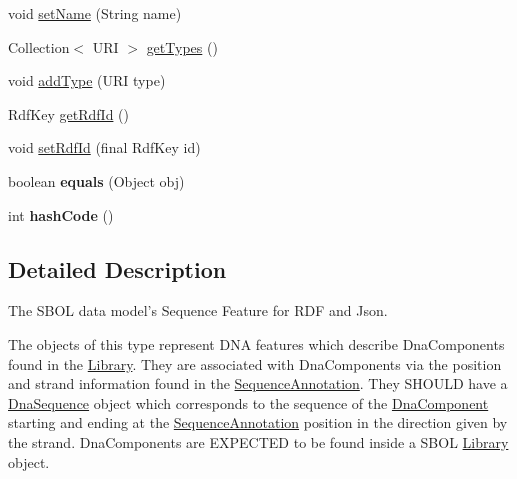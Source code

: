\begin{DoxyCompactItemize}
\item 
void \hyperlink{classorg_1_1sbolstandard_1_1lib_s_b_o_lj_1_1_sequence_feature_af407b7f97daa1f39f040acf4ac6c830c}{setName} (String name)
\item 
Collection$<$ URI $>$ \hyperlink{classorg_1_1sbolstandard_1_1lib_s_b_o_lj_1_1_sequence_feature_a75554518929bf85671383ac2c0839963}{getTypes} ()
\item 
void \hyperlink{classorg_1_1sbolstandard_1_1lib_s_b_o_lj_1_1_sequence_feature_ae714b030621449e61274bdb84a09c0fb}{addType} (URI type)
\item 
RdfKey \hyperlink{classorg_1_1sbolstandard_1_1lib_s_b_o_lj_1_1_sequence_feature_a6fd7acfe199c9c10f6f415a95254e64c}{getRdfId} ()
\item 
void \hyperlink{classorg_1_1sbolstandard_1_1lib_s_b_o_lj_1_1_sequence_feature_a1f7950ca9962cf04e766100c0c55e1ea}{setRdfId} (final RdfKey id)
\item 
\hypertarget{classorg_1_1sbolstandard_1_1lib_s_b_o_lj_1_1_sequence_feature_ab69bb28a8ebfa140726fb44f4d4ae64b}{
boolean {\bfseries equals} (Object obj)}
\label{classorg_1_1sbolstandard_1_1lib_s_b_o_lj_1_1_sequence_feature_ab69bb28a8ebfa140726fb44f4d4ae64b}

\item 
\hypertarget{classorg_1_1sbolstandard_1_1lib_s_b_o_lj_1_1_sequence_feature_a529b5fa19deb681e79204e08aa5b2725}{
int {\bfseries hashCode} ()}
\label{classorg_1_1sbolstandard_1_1lib_s_b_o_lj_1_1_sequence_feature_a529b5fa19deb681e79204e08aa5b2725}

\end{DoxyCompactItemize}


\subsection{Detailed Description}
The SBOL data model's Sequence Feature for RDF and Json.

The objects of this type represent DNA features which describe DnaComponents found in the \hyperlink{classorg_1_1sbolstandard_1_1lib_s_b_o_lj_1_1_library}{Library}. They are associated with DnaComponents via the position and strand information found in the \hyperlink{classorg_1_1sbolstandard_1_1lib_s_b_o_lj_1_1_sequence_annotation}{SequenceAnnotation}. They SHOULD have a \hyperlink{classorg_1_1sbolstandard_1_1lib_s_b_o_lj_1_1_dna_sequence}{DnaSequence} object which corresponds to the sequence of the \hyperlink{classorg_1_1sbolstandard_1_1lib_s_b_o_lj_1_1_dna_component}{DnaComponent} starting and ending at the \hyperlink{classorg_1_1sbolstandard_1_1lib_s_b_o_lj_1_1_sequence_annotation}{SequenceAnnotation} position in the direction given by the strand. DnaComponents are EXPECTED to be found inside a SBOL \hyperlink{classorg_1_1sbolstandard_1_1lib_s_b_o_lj_1_1_library}{Library} object.

